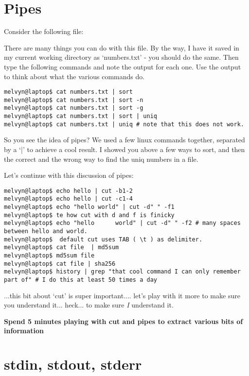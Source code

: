 \documentclass[10pt]{article}
\begin{document}
\section*{Pipes}
Consider the following file:



There are many things you can do with this file. By the way, I have it saved in
my current working directory as `numbers.txt' - you should do the same. Then
type the following commands and note the output for each one. Use the output to
think about what the various commands do.

\begin{lstlisting}[style=term]
melvyn@laptop$ cat numbers.txt | sort
melvyn@laptop$ cat numbers.txt | sort -n
melvyn@laptop$ cat numbers.txt | sort -g
melvyn@laptop$ cat numbers.txt | sort | uniq
melvyn@laptop$ cat numbers.txt | uniq # note that this does not work.
\end{lstlisting}

So you see the idea of pipes? We used a few linux commands together, separated
by a `|' to achieve a cool result. I showed you above a few ways to sort, and
then the correct and the wrong way to find the uniq numbers in a file. 

Let's continue with this discussion of pipes:

\begin{lstlisting}[style=term]
melvyn@laptop$ echo hello | cut -b1-2
melvyn@laptop$ echo hello | cut -c1-4
melvyn@laptop$ echo "hello world" | cut -d" " -f1
melvyn@laptop$ te how cut with d and f is finicky
melvyn@laptop$ echo "hello      world" | cut -d" " -f2 # many spaces between hello and world.
melvyn@laptop$  default cut uses TAB ( \t ) as delimiter.
melvyn@laptop$ cat file  | md5sum
melvyn@laptop$ md5sum file
melvyn@laptop$ cat file | sha256
melvyn@laptop$ history | grep "that cool command I can only remember part of" # I do this at least 50 times a day
\end{lstlisting} 

...this bit about `cut' is super important.... let's play with it more to make
sure you understand it... heck... to make sure \textit{I} understand it.


\textbf{Spend 5 minutes playing with cut and pipes to extract various bits of
information}

\section*{stdin, stdout, stderr}
\end{document}
